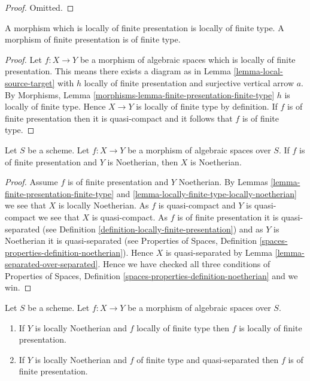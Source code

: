 \begin{proof}
Omitted.
\end{proof}

\begin{lemma}
\label{lemma-finite-presentation-finite-type}
A morphism which is locally of finite presentation is locally of finite type.
A morphism of finite presentation is of finite type.
\end{lemma}

\begin{proof}
Let $f : X \to Y$ be a morphism of algebraic spaces which is locally of
finite presentation. This means there exists a diagram as in
Lemma \ref{lemma-local-source-target}
with $h$ locally of finite presentation and surjective vertical arrow $a$. By
Morphisms, Lemma \ref{morphisms-lemma-finite-presentation-finite-type}
$h$ is locally of finite type.
Hence $X \to Y$ is locally of finite type by definition.
If $f$ is of finite presentation then it is quasi-compact and
it follows that $f$ is of finite type.
\end{proof}

\begin{lemma}
\label{lemma-finite-presentation-noetherian}
Let $S$ be a scheme.
Let $f : X \to Y$ be a morphism of algebraic spaces over $S$.
If $f$ is of finite presentation and $Y$ is Noetherian,
then $X$ is Noetherian.
\end{lemma}

\begin{proof}
Assume $f$ is of finite presentation and $Y$ Noetherian. By
Lemmas \ref{lemma-finite-presentation-finite-type} and
\ref{lemma-locally-finite-type-locally-noetherian}
we see that $X$ is locally Noetherian. As $f$ is quasi-compact
and $Y$ is quasi-compact we see that $X$ is quasi-compact.
As $f$ is of finite presentation it is quasi-separated (see
Definition \ref{definition-locally-finite-presentation})
and as $Y$ is Noetherian it is quasi-separated (see
Properties of Spaces,
Definition \ref{spaces-properties-definition-noetherian}).
Hence $X$ is quasi-separated by
Lemma \ref{lemma-separated-over-separated}.
Hence we have checked all three conditions of
Properties of Spaces,
Definition \ref{spaces-properties-definition-noetherian}
and we win.
\end{proof}

\begin{lemma}
\label{lemma-noetherian-finite-type-finite-presentation}
Let $S$ be a scheme.
Let $f : X \to Y$ be a morphism of algebraic spaces over $S$.
\begin{enumerate}
\item If $Y$ is locally Noetherian and $f$ locally of finite type
then $f$ is locally of finite presentation.
\item If $Y$ is locally Noetherian and $f$ of finite type and quasi-separated
then $f$ is of finite presentation.
\end{enumerate}
\end{lemma}

